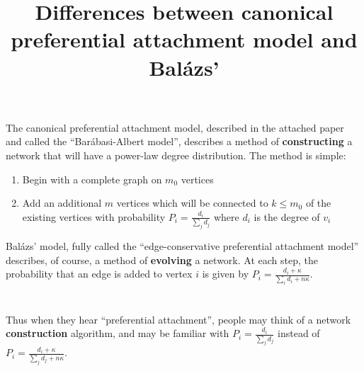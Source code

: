\documentclass[11pt]{article}
\begin{document}
\title{\vspace{-5mm}Differences between canonical preferential attachment model and Bal\'{a}zs'}
\maketitle

The canonical preferential attachment model, described in the attached paper and called the ``Bar\'{a}basi-Albert model'', describes a method of \textbf{constructing} a network that will have a power-law degree distribution. The method is simple:

\begin{enumerate}
\item Begin with a complete graph on $m_0$ vertices
\item Add an additional $m$ vertices which will be connected to $k \leq m_0$ of the existing vertices with probability $P_i = \frac{d_i}{\sum\limits_j d_j}$ where $d_i$ is the degree of $v_i$
\end{enumerate}

Bal\'{a}zs' model, fully called the ``edge-conservative preferential attachment model'' describes, of course, a method of \textbf{evolving} a network. At each step, the probability that an edge is added to vertex $i$ is given by $P_i = \frac{d_i + \kappa}{\sum\limits_i d_i + n \kappa}$. \\ \\ \\

{\huge Thus when they hear ``preferential attachment'', people may think of a network \textbf{construction} algorithm, and may be familiar with $P_i = \frac{d_i}{\sum\limits_j d_j}$ instead of $P_i = \frac{d_i + \kappa}{\sum\limits_j d_j + n \kappa}$.}



\end{document}
